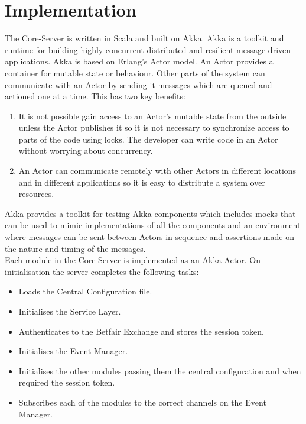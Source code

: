 \section{Implementation}

	The Core-Server is written in Scala and built on Akka. Akka is a toolkit and runtime for building highly concurrent distributed and resilient message-driven applications\cite{Akka}. Akka is based on Erlang’s Actor model. An Actor provides a container for mutable state or behaviour. Other parts of the system can communicate with an Actor by sending it messages which are queued and actioned one at a time. This has two key benefits:
	
	\begin{enumerate}
		\item It is not possible gain access to an Actor's mutable state from the outside unless the Actor publishes it so it is not necessary to synchronize access to parts of the code using locks. The developer can write code in an Actor without worrying about concurrency.
		\item An Actor can communicate remotely with other Actors in different locations and in different applications so it is easy to distribute a system over resources.
	\end{enumerate}

	Akka provides a toolkit for testing Akka components which includes mocks that can be used to mimic implementations of all the components and an environment where messages can be sent between Actors in sequence and assertions made on the nature and timing of the messages.\\
		
	Each module in the Core Server is implemented as an Akka Actor. On initialisation the server completes the following tasks:
	\begin{itemize}
		\item Loads the Central Configuration file.
		\item Initialises the Service Layer.
		\item Authenticates to the Betfair Exchange and stores the session token.
		\item Initialises the Event Manager.
		\item Initialises the other modules passing them the central configuration and when required the session token.
		\item Subscribes each of the modules to the correct channels on the Event Manager.
	\end{itemize}	 

